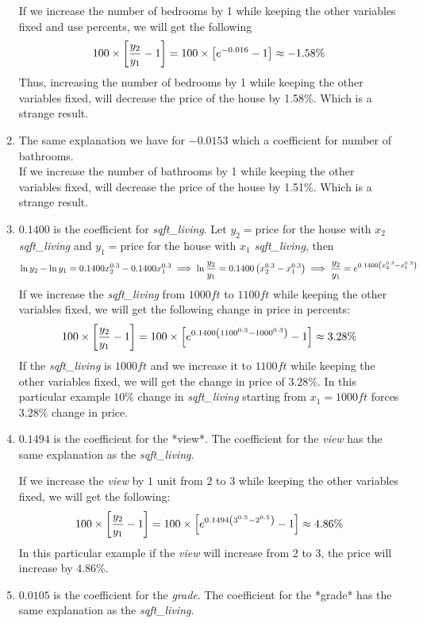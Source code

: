 \documentclass[12pt]{article}
\begin{document}
\begin{enumerate}
If we increase the number of bedrooms by 1 while keeping the other variables fixed and use percents, we will get the following
$$
\large
100 \times \left[\frac{y_2}{y_1} - 1 \right] = 100 \times \left[e^{-0.016} -1 \right] \approx -1.58\%
$$
Thus, increasing the number of bedrooms by 1 while keeping the other variables fixed, will decrease the price of the house by 1.58\%. Which is a strange result.
\item The same explanation we have for $-0.0153$ which a coefficient for number of bathrooms. \\
If we increase the number of bathrooms by 1 while keeping the other variables fixed, will decrease the price of the house by 1.51\%. Which is a strange result.
 \item $0.1400$ is the coefficient for {\it sqft\_living}.
Let $y_2 = \text{price}$ for the house with $x_2$ {\it sqft\_living} and $y_1 = \text{price}$ for the house with $x_1$ {\it sqft\_living}, then 
$$
\large
\ln y_2 - \ln y_1 = 0.1400 x_2^{0.3} - 0.1400 x_1^{0.3} \implies \ln \frac{y_2}{y_1} = 0.1400 \left( x_2^{0.3} - x_1^{0.3}\right)\implies \frac{y_2}{y_1}=e^{0.1400 \left( x_2^{0.3} - x_1^{0.3}\right)}
$$
If we increase the {\it sqft\_living} from $1000ft$ to $1100ft$ while keeping the other variables fixed, we will get the following change in price in percents:
$$
\large
100 \times \left[\frac{y_2}{y_1} -1  \right] = 100 \times \left[ e^{0.1400 \left( 1100^{0.3} - 1000^{0.3}\right)} - 1 \right]\approx 3.28\%
$$
If the {\it sqft\_living} is $1000ft$ and we increase it to $1100ft$ while keeping the other variables fixed, we will get the change in price of $3.28\%$. In this particular example $10\%$ change in {\it sqft\_living} starting from $x_1 = 1000ft$ forces $3.28\%$ change in price.
\item  $0.1494$ is the coefficient for the *view*.
The coefficient for the {\it view} has the same explanation as the {\it sqft\_living}.

If we increase the {\it view} by $1$ unit from $2$ to $3$ while keeping the other variables fixed, we will get the following:
$$
\large 
100 \times \left[\frac{y_2}{y_1} -1  \right] = 100 \times \left[ e^{0.1494 \left( 3^{0.5} - 2^{0.5}\right)} - 1 \right]\approx 4.86\%
$$
In this particular example if the {\it view} will increase from $2$ to $3$, the price will increase by 4.86\%.

\item $0.0105$ is the coefficient for the {\it grade}. 
The coefficient for the *grade* has the same explanation as the {\it sqft\_living}.


\end{enumerate}
\end{document}
